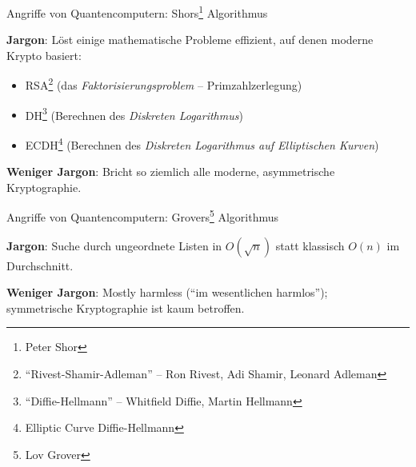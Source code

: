 \documentclass{rosenpass-beamer}
\let\say\enquote
\begin{document}
\begin{frame}{Angriffe von Quantencomputern: Shors\footnote{Peter Shor} Algorithmus}

\textbf{Jargon}: Löst einige mathematische Probleme effizient, auf denen moderne Krypto basiert:




\begin{itemize}
    \item RSA\footnote{\say{Rivest-Shamir-Adleman} -- Ron Rivest, Adi Shamir, Leonard Adleman} (das \emph{Faktorisierungsproblem} – Primzahlzerlegung)
    \item DH\footnote{\say{Diffie-Hellmann} -- Whitfield Diffie, Martin Hellmann} (Berechnen des \emph{Diskreten Logarithmus})
    \item ECDH\footnote{Elliptic Curve Diffie-Hellmann} (Berechnen des \emph{Diskreten Logarithmus auf Elliptischen Kurven})
\end{itemize}


\textbf{Weniger Jargon}: Bricht so ziemlich alle moderne, asymmetrische Kryptographie.

\end{frame}

\begin{frame}{Angriffe von Quantencomputern: Grovers\footnote{Lov Grover} Algorithmus}

\textbf{Jargon}: Suche durch ungeordnete Listen in $O(\sqrt{n})$ statt klassisch $O(n)$ im Durchschnitt.

\vspace{5mm}


\textbf{Weniger Jargon}: Mostly harmless (\say{im wesentlichen harmlos});\\
symmetrische Kryptographie ist kaum betroffen.

\end{frame}
\end{document}
